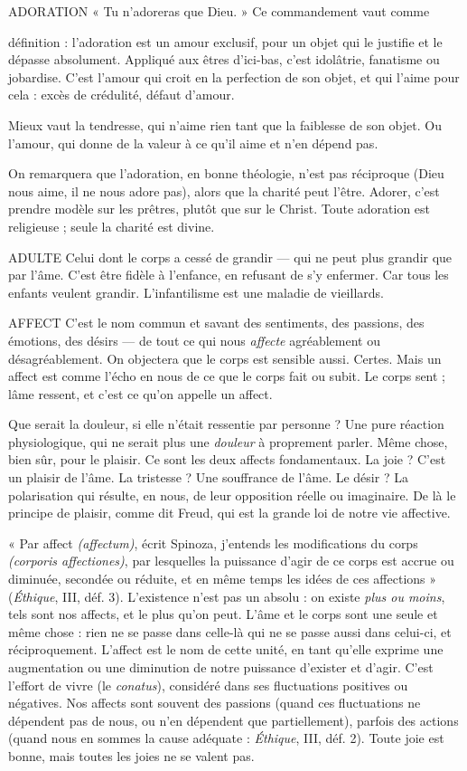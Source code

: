 ADORATION « Tu n’adoreras que Dieu. » Ce commandement vaut comme

définition : l’adoration est un amour exclusif, pour un objet
qui le justifie et le dépasse absolument. Appliqué aux êtres d’ici-bas, c’est idolâtrie,
fanatisme ou jobardise. C’est l’amour qui croit en la perfection de son
objet, et qui l'aime pour cela : excès de crédulité, défaut d'amour.

Mieux vaut la tendresse, qui n’aime rien tant que la faiblesse de son objet.
Ou l'amour, qui donne de la valeur à ce qu’il aime et n’en dépend pas.

On remarquera que l’adoration, en bonne théologie, n’est pas réciproque
(Dieu nous aime, il ne nous adore pas), alors que la charité peut l’être. Adorer,
c’est prendre modèle sur les prêtres, plutôt que sur le Christ. Toute adoration
est religieuse ; seule la charité est divine.

ADULTE Celui dont le corps a cessé de grandir — qui ne peut plus grandir
que par l’âme. C’est être fidèle à l'enfance, en refusant de s’y
enfermer. Car tous les enfants veulent grandir. L’infantilisme est une maladie
de vieillards.

AFFECT C’est le nom commun et savant des sentiments, des passions, des
émotions, des désirs — de tout ce qui nous {\it affecte} agréablement ou
désagréablement. On objectera que le corps est sensible aussi. Certes. Mais un
affect est comme l’écho en nous de ce que le corps fait ou subit. Le corps sent ;
lâme ressent, et c’est ce qu’on appelle un affect.

Que serait la douleur, si elle n’était ressentie par personne ? Une pure réaction
physiologique, qui ne serait plus une {\it douleur} à proprement parler. Même
chose, bien sûr, pour le plaisir. Ce sont les deux affects fondamentaux. La joie ?
C’est un plaisir de l’âme. La tristesse ? Une souffrance de l’âme. Le désir ? La
polarisation qui résulte, en nous, de leur opposition réelle ou imaginaire. De là
le principe de plaisir, comme dit Freud, qui est la grande loi de notre vie affective.

« Par affect {\it (affectum)}, écrit Spinoza, j'entends les modifications du corps
{\it (corporis affectiones)}, par lesquelles la puissance d’agir de ce corps est accrue ou
diminuée, secondée ou réduite, et en même temps les idées de ces affections »
({\it Éthique}, III, déf. 3). L'existence n’est pas un absolu : on existe {\it plus ou moins},
tels sont nos affects, et le plus qu’on peut. L'âme et le corps sont une seule et
même chose : rien ne se passe dans celle-là qui ne se passe aussi dans celui-ci, et
réciproquement. L’affect est le nom de cette unité, en tant qu’elle exprime une
augmentation ou une diminution de notre puissance d’exister et d’agir. C’est
l'effort de vivre (le {\it conatus}), considéré dans ses fluctuations positives ou négatives.
Nos affects sont souvent des passions (quand ces fluctuations ne dépendent
pas de nous, ou n’en dépendent que partiellement), parfois des actions
(quand nous en sommes la cause adéquate : {\it Éthique}, III, déf. 2). Toute joie est
bonne, mais toutes les joies ne se valent pas.

